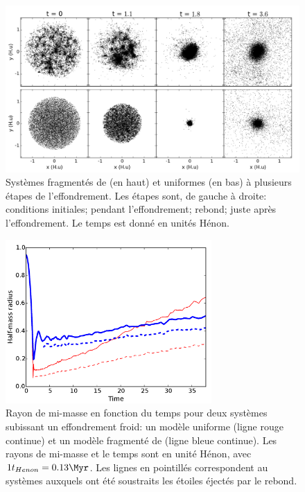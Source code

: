 \begin{figure}
\begin{center}
\includegraphics[width=\textwidth]{Figures/3_collapse}
\caption{Systèmes fragmentés de \HubLem (en haut) et uniformes (en bas) à plusieurs étapes de l'effondrement. Les étapes sont, de gauche à droite: conditions initiales; pendant l'effondrement; rebond; juste après l'effondrement. Le temps est donné en unités H\'enon.}
\label{Fig:resume_collapse}
\end{center}
\end{figure}




\begin{figure}
\begin{center}
\includegraphics[width=0.7\textwidth]{Figures/3_Rhm_global}
\caption{Rayon de mi-masse en fonction du temps pour deux systèmes subissant un effondrement froid: un modèle uniforme (ligne rouge continue) et un modèle fragmenté de \HubLem (ligne bleue continue). Les rayons de mi-masse et le temps sont en unité H\'enon, avec $1 t_{Henon} =  0.13 \Myr$. Les lignes en pointillés correspondent au systèmes auxquels ont été soustraits les étoiles éjectés par le rebond.}
\label{Fig:resume_Rhm_global}
\end{center}
\end{figure}



